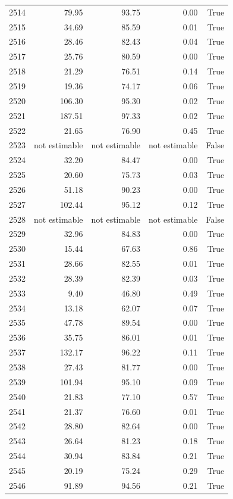 \begin{longtable}{rrrrr}
2514 & 79.95 & 93.75 & 0.00 & True \\
2515 & 34.69 & 85.59 & 0.01 & True \\
2516 & 28.46 & 82.43 & 0.04 & True \\
2517 & 25.76 & 80.59 & 0.00 & True \\
2518 & 21.29 & 76.51 & 0.14 & True \\
2519 & 19.36 & 74.17 & 0.06 & True \\
2520 & 106.30 & 95.30 & 0.02 & True \\
2521 & 187.51 & 97.33 & 0.02 & True \\
2522 & 21.65 & 76.90 & 0.45 & True \\
2523 & not estimable & not estimable & not estimable & False \\
2524 & 32.20 & 84.47 & 0.00 & True \\
2525 & 20.60 & 75.73 & 0.03 & True \\
2526 & 51.18 & 90.23 & 0.00 & True \\
2527 & 102.44 & 95.12 & 0.12 & True \\
2528 & not estimable & not estimable & not estimable & False \\
2529 & 32.96 & 84.83 & 0.00 & True \\
2530 & 15.44 & 67.63 & 0.86 & True \\
2531 & 28.66 & 82.55 & 0.01 & True \\
2532 & 28.39 & 82.39 & 0.03 & True \\
2533 & 9.40 & 46.80 & 0.49 & True \\
2534 & 13.18 & 62.07 & 0.07 & True \\
2535 & 47.78 & 89.54 & 0.00 & True \\
2536 & 35.75 & 86.01 & 0.01 & True \\
2537 & 132.17 & 96.22 & 0.11 & True \\
2538 & 27.43 & 81.77 & 0.00 & True \\
2539 & 101.94 & 95.10 & 0.09 & True \\
2540 & 21.83 & 77.10 & 0.57 & True \\
2541 & 21.37 & 76.60 & 0.01 & True \\
2542 & 28.80 & 82.64 & 0.00 & True \\
2543 & 26.64 & 81.23 & 0.18 & True \\
2544 & 30.94 & 83.84 & 0.21 & True \\
2545 & 20.19 & 75.24 & 0.29 & True \\
2546 & 91.89 & 94.56 & 0.21 & True \\

\end{longtable}
